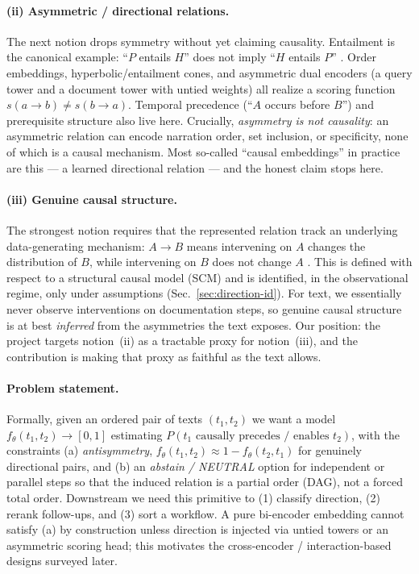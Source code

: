 \paragraph{(ii) Asymmetric / directional relations.}
The next notion drops symmetry without yet claiming causality. Entailment is the
canonical example: ``$P$ entails $H$'' does not imply ``$H$ entails $P$''
\citep{found:bowman2015snli,found:williams2018mnli}. Order embeddings,
hyperbolic/entailment cones, and asymmetric dual encoders (a query tower and a
document tower with untied weights) all realize a scoring function
$s(a\!\to\!b)\neq s(b\!\to\!a)$. Temporal precedence (``$A$ occurs before $B$'')
and prerequisite structure also live here. Crucially, \emph{asymmetry is not
causality}: an asymmetric relation can encode narration order, set inclusion, or
specificity, none of which is a causal mechanism. Most so-called ``causal
embeddings'' in practice are this --- a learned directional relation --- and the
honest claim stops here.

\paragraph{(iii) Genuine causal structure.}
The strongest notion requires that the represented relation track an underlying
data-generating mechanism: $A\to B$ means intervening on $A$ changes the
distribution of $B$, while intervening on $B$ does not change $A$
\citep{found:pearl2009causality,found:peters2017elements}. This is defined with
respect to a structural causal model (SCM) and is identified, in the
observational regime, only under assumptions (Sec.~\ref{sec:direction-id}). For
text, we essentially never observe interventions on documentation steps, so
genuine causal structure is at best \emph{inferred} from the asymmetries the
text exposes. Our position: the project targets notion~(ii) as a tractable proxy
for notion~(iii), and the contribution is making that proxy as faithful as the
text allows.

\paragraph{Problem statement.}
Formally, given an ordered pair of texts $(t_1,t_2)$ we want a model
$f_\theta(t_1,t_2)\to[0,1]$ estimating $P(t_1 \text{ causally precedes /
enables } t_2)$, with the constraints (a) \emph{antisymmetry},
$f_\theta(t_1,t_2)\approx 1-f_\theta(t_2,t_1)$ for genuinely directional pairs,
and (b) an \emph{abstain / NEUTRAL} option for independent or parallel steps so
that the induced relation is a partial order (DAG), not a forced total order.
Downstream we need this primitive to (1) classify direction, (2) rerank
follow-ups, and (3) sort a workflow. A pure bi-encoder embedding cannot satisfy
(a) by construction unless direction is injected via untied towers or an
asymmetric scoring head; this motivates the cross-encoder / interaction-based
designs surveyed later.

